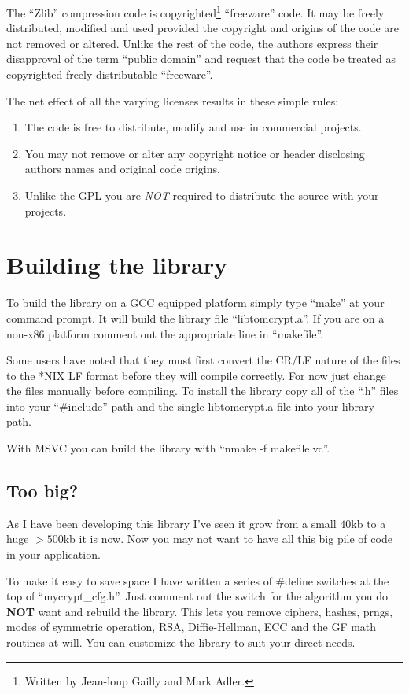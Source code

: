 \documentclass{book}
\begin{document}
The ``Zlib'' compression code is copyrighted\footnote{Written by Jean-loup Gailly and Mark Adler.} ``freeware'' code.  It
may be freely distributed, modified and used provided the copyright and origins of the code are not removed or altered.
Unlike the rest of the code, the authors express their disapproval of the term ``public domain'' and request that the
code be treated as copyrighted freely distributable ``freeware''.

The net effect of all the varying licenses results in these simple rules:
\begin{enumerate}
     \item The code is free to distribute, modify and use in commercial projects.
     \item You may not remove or alter any copyright notice or header disclosing authors names and original code origins.
     \item Unlike the GPL you are {\em NOT} required to distribute the source with your projects.
\end{enumerate}

\section{Building the library}

To build the library on a GCC equipped platform simply type ``make'' at your command prompt.  It will build the library
file ``libtomcrypt.a''.  If you are on a non-x86 platform comment out the appropriate line in ``makefile''.  

Some users have noted that they must first convert the CR/LF nature of the files to the *NIX LF format before they will
compile correctly.  For now just change the files
manually before compiling.  To install the library copy all of the ``.h'' files into your ``\#include'' path and the 
single libtomcrypt.a file into your library path.

With MSVC you can build the library with ``nmake -f makefile.vc''.

\subsection{Too big?}
As I have been developing this library I've seen it grow from a small $40$kb to a huge $>500$kb it is now.  Now you 
may not want to have all this big pile of code in your application.

To make it easy to save space I have written a series of \#define switches at the top of ``mycrypt\_cfg.h''.  Just comment out the
switch for the algorithm you do {\bf NOT} want and rebuild the library.  This lets you remove ciphers, hashes, prngs, modes of
symmetric operation, RSA, Diffie-Hellman, ECC and the GF math routines at will.  You can customize the library to suit your 
direct needs.  
\end{document}
